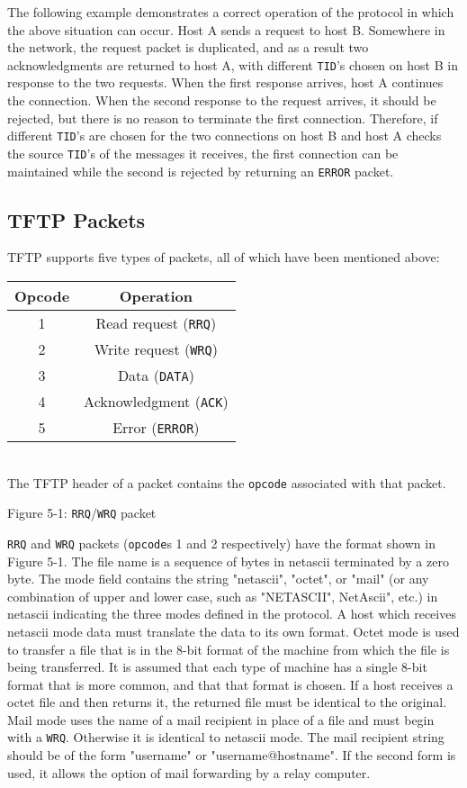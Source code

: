 \documentclass[12pt]{article}
\begin{document}
The following example demonstrates a correct operation of the protocol in which the above situation can occur. Host A sends a request to host B. Somewhere in the network, the request packet is duplicated, and as a result two acknowledgments are returned to host A, with different \verb|TID|'s chosen on host B in response to the two requests.  When the first response arrives, host A continues the connection. When the second response to the request arrives, it should be rejected, but there is no reason to terminate the first connection. Therefore, if different \verb|TID|'s are chosen for the two connections on host B and host A checks the source \verb|TID|'s of the messages it receives, the first connection can be maintained while the second is rejected by returning an   \verb|ERROR| packet.

\subsection{TFTP Packets}
TFTP supports five types of packets, all of which have been mentioned above:\\

\begin{tabular}{ |c|c| }
  \hline
  Opcode	&	Operation\\
  \hline
  1			&	Read request (\verb|RRQ|)\\
  \hline
  2		 	&	Write request (\verb|WRQ|)\\
  \hline
  3			&	Data (\verb|DATA|)\\
  \hline
  4			&	Acknowledgment (\verb|ACK|)\\
  \hline
  5		 	&	Error (\verb|ERROR|)\\
  \hline
  \end{tabular}\\

The TFTP header of a packet contains the \verb|opcode| associated with that packet.
\begin{center}
Figure 5-1: \verb|RRQ|/\verb|WRQ| packet
\end{center}

\verb|RRQ| and \verb|WRQ| packets (\verb|opcode|s 1 and 2 respectively) have the format shown in Figure 5-1. The file name is a sequence of bytes in netascii terminated by a zero byte. The mode field contains the string "netascii", "octet", or "mail" (or any combination of upper and lower case, such as "NETASCII", NetAscii", etc.) in netascii indicating the three modes defined in the protocol. A host which receives netascii mode data must translate the data to its own format.  Octet mode is used to transfer a file that is in the 8-bit format of the machine from which the file is being transferred. It is assumed that each type of machine has a single 8-bit format that is more common, and that that format is chosen. If a host receives a octet file and then returns it, the returned file must be identical to the original. Mail mode uses the name of a mail recipient in place of a file and must begin with a \verb|WRQ|. Otherwise it is identical to netascii mode. The mail recipient string should be of the form "username" or "username@hostname". If the second form is used, it allows the option of mail forwarding by a relay computer.\\
\end{document}
